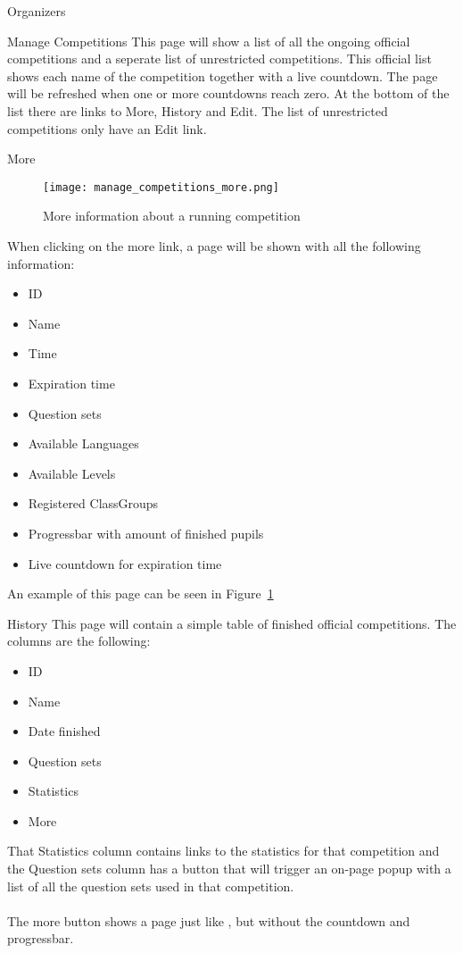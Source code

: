 \begin{section}{Organizers}
	\begin{subsection}{Manage Competitions}
		This page will show a list of all the ongoing official competitions and a seperate
		list of unrestricted competitions.
		This official list shows each name of the competition together with a live countdown.
		The page will be refreshed when one or more countdowns reach zero.
		At the bottom of the list there are links to More, History and Edit.
		The list of unrestricted competitions only have an Edit link.
		\begin{subsubsection}{More}
			\begin{figure}[!h]
			  \centering
				\texttt{[image: manage\_competitions\_more.png]}
			  \caption{More information about a running competition}
			  \label{manage_competitions_more}
			\end{figure}
			\label{sec:manage_comp_more}
			When clicking on the more link, a page will be shown with all the following
			information:
			\begin{itemize}
				\item ID
				\item Name
				\item Time
				\item Expiration time
				\item Question sets
				\item Available Languages
				\item Available Levels
				\item Registered ClassGroups
				\item Progressbar with amount of finished pupils
				\item Live countdown for expiration time
			\end{itemize}
			An example of this page can be seen in Figure~\ref{manage_competitions_more}
		\end{subsubsection}
		\begin{subsubsection}{History}
			This page will contain a simple table of finished official competitions.
			The columns are the following:
			\begin{itemize}
				\item ID
				\item Name
				\item Date finished
				\item Question sets
				\item Statistics
				\item More
			\end{itemize}
			That Statistics column contains links to the statistics for that competition and the
			Question sets column has a button that will trigger an on-page popup with a
			list of all the question sets used in that competition.\\
			\\
			The more button shows a page just like , but
			without the countdown and progressbar.
		\end{subsubsection}
		

\end{subsection}
\end{section}
